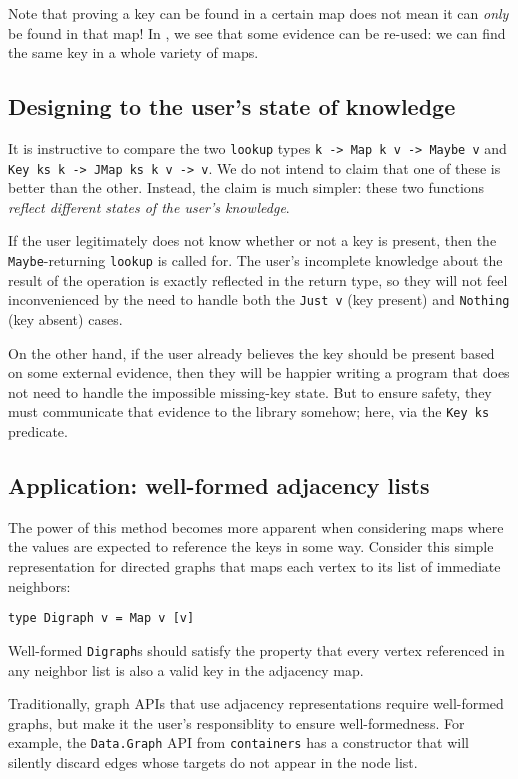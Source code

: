 \documentclass[format=sigplan, review=false, screen=true]{acmart}
\begin{document}
Note that proving a key can be found in a certain map does not mean it can \emph{only}
be found in that map! In , we see that some evidence can be re-used:
we can find the same key in a whole variety of maps.

\subsection{Designing to the user's state of knowledge}
It is instructive to compare the two \texttt{lookup} types \texttt{k -> Map k v -> Maybe v}
and \texttt{Key ks k -> JMap ks k v -> v}. We do not intend to claim that
one of these is better than the other. Instead, the claim is much simpler: these two functions
\emph{reflect different states of the user's knowledge}.

If the user legitimately does not know whether or not a key is present, then the
\texttt{Maybe}-returning \texttt{lookup} is called for. The user's incomplete knowledge
about the result of the operation is exactly reflected in the return type, so they will
not feel inconvenienced by the need to handle both the \texttt{Just v} (key present)
and \texttt{Nothing} (key absent) cases.

On the other hand, if the user already believes the key should be present based on some
external evidence, then they will be happier writing a program that does not need to handle
the impossible missing-key state. But to ensure safety, they must communicate that evidence to the library
somehow; here, via the \texttt{Key ks} predicate.

\subsection{Application: well-formed adjacency lists}

The power of this method becomes more apparent when considering maps where
the values are expected to reference the keys in some way. Consider this
simple representation for directed graphs that maps each vertex to its list of immediate neighbors:
\begin{verbatim}
type Digraph v = Map v [v]
\end{verbatim}
Well-formed \texttt{Digraph}s
should satisfy the property that every vertex referenced in any neighbor list is also
a valid key in the adjacency map.

Traditionally, graph APIs that use adjacency representations require well-formed
graphs, but make it the user's responsiblity to ensure well-formedness. For example,
the \texttt{Data.Graph} API from \texttt{containers} has a constructor that
will silently discard edges whose targets do not appear in the node list.
\end{document}
